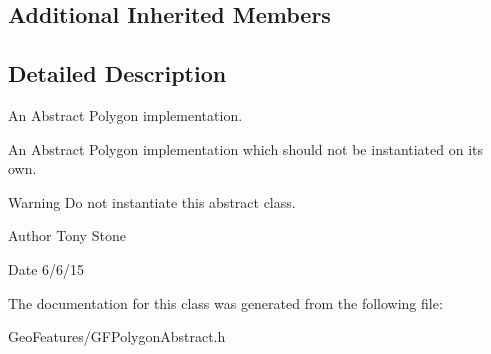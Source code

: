 \subsection*{Additional Inherited Members}


\subsection{Detailed Description}
An Abstract Polygon implementation. 

An Abstract Polygon implementation which should not be instantiated on it\textquotesingle{}s own.

\begin{DoxyWarning}{Warning}
Do not instantiate this abstract class.
\end{DoxyWarning}
\begin{DoxyAuthor}{Author}
Tony Stone 
\end{DoxyAuthor}
\begin{DoxyDate}{Date}
6/6/15 
\end{DoxyDate}


The documentation for this class was generated from the following file\+:\begin{DoxyCompactItemize}
\item 
Geo\+Features/G\+F\+Polygon\+Abstract.\+h\end{DoxyCompactItemize}
